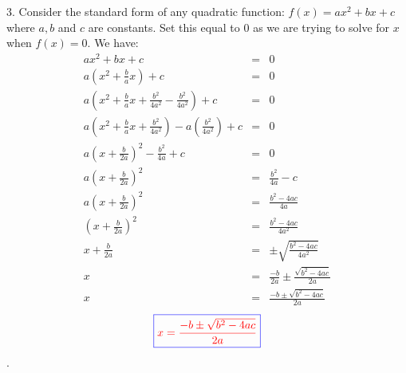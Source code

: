 \documentclass[addpoints, 12pt]{exam}
\theoremstyle{remark}
\begin{document}
3. Consider the standard form of any quadratic function: $f(x) = ax^2 + bx +c$ where $a, b$ and $c$ are constants. Set this equal to 0 as we are trying to solve for $x$ when $f(x) = 0$. We have:
\begin{eqnarray*}
    ax^2 + bx +c & = & 0 \\
    a\left(x^2 + \frac{b}{a}x\right) + c & = & 0 \\
    a\left(x^2 + \frac{b}{a}x + \frac{b^2}{4a^2} - \frac{b^2}{4a^2}\right) + c & = & 0 \\
    a\left(x^2 + \frac{b}{a}x + \frac{b^2}{4a^2}\right) - a\left(\frac{b^2}{4a^2}\right) + c & = & 0 \\
    a\left(x + \frac{b}{2a}\right)^2 - \frac{b^2}{4a} + c & = & 0 \\
    a\left(x + \frac{b}{2a}\right)^2 & = & \frac{b^2}{4a} - c \\
    a\left(x + \frac{b}{2a}\right)^2 & = & \frac{b^2 - 4ac}{4a} \\
    \left(x + \frac{b}{2a}\right)^2 & = & \frac{b^2 - 4ac}{4a^2} \\
    x + \frac{b}{2a} & = & \pm \sqrt{\frac{b^2-4ac}{4a^2}} \\
    x & = & \frac{-b}{2a}\pm \frac{\sqrt{b^2-4ac}}{2a} \\
    x & = & \frac{-b \pm \sqrt{b^2 - 4ac}}{2a}
\end{eqnarray*}
$$\textcolor{blue}{\boxed{\textcolor{red}{x = \frac{-b \pm \sqrt{b^2 - 4ac}}{2a}}}}$$.
\end{document}

